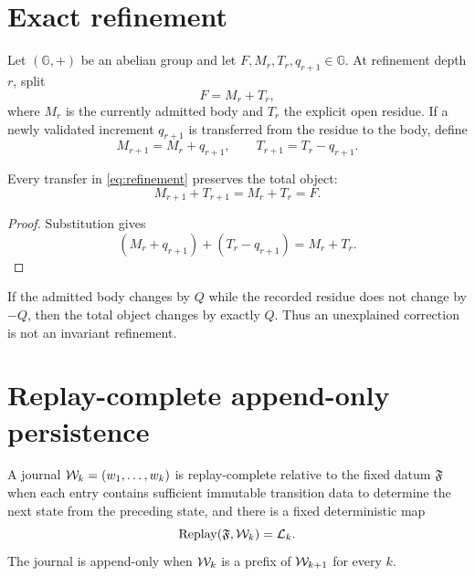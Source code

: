 \section{Exact refinement}

Let $(\mathbb G,+)$ be an abelian group and let $F,M_r,T_r,q_{r+1}\in\mathbb G$. At refinement depth $r$, split
\begin{equation}
F=M_r+T_r,
\label{eq:body-tail}
\end{equation}
where $M_r$ is the currently admitted body and $T_r$ the explicit open residue. If a newly validated increment $q_{r+1}$ is transferred from the residue to the body, define
\begin{equation}
M_{r+1}=M_r+q_{r+1},\qquad
T_{r+1}=T_r-q_{r+1}.
\label{eq:refinement}
\end{equation}

\begin{theorem}
Every transfer in \cref{eq:refinement} preserves the total object:
\begin{equation}
M_{r+1}+T_{r+1}=M_r+T_r=F.
\label{eq:refinement-invariance}
\end{equation}
\end{theorem}

\begin{proof}
Substitution gives
\[
(M_r+q_{r+1})+(T_r-q_{r+1})=M_r+T_r.
\]
\end{proof}

\begin{corollary}
If the admitted body changes by $Q$ while the recorded residue does not change by $-Q$, then the total object changes by exactly $Q$. Thus an unexplained correction is not an invariant refinement.
\end{corollary}

\section{Replay-complete append-only persistence}

\begin{definition}
A journal $\mathcal W_k=(w_1,\ldots,w_k)$ is replay-complete relative to the fixed datum $\mathfrak F$ when each entry contains sufficient immutable transition data to determine the next state from the preceding state, and there is a fixed deterministic map
\[
\operatorname{Replay}(\mathfrak F,\mathcal W_k)=\mathcal L_k.
\]
The journal is append-only when $\mathcal W_k$ is a prefix of $\mathcal W_{k+1}$ for every $k$.
\end{definition}

